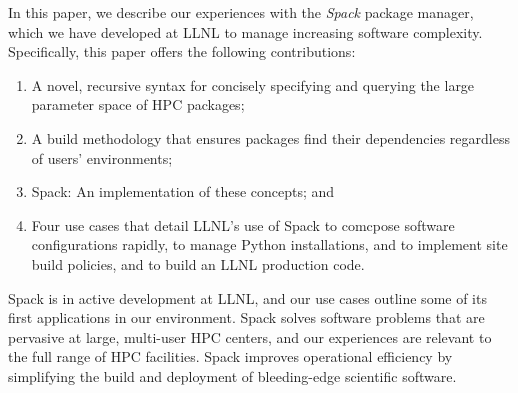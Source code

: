 In this paper, we describe our experiences with the {\it Spack} package manager,
which we have developed at LLNL to manage increasing software complexity.
Specifically, this paper offers the following contributions:
\begin{enumerate}
\item A novel, recursive syntax for concisely specifying and querying
      the large parameter space of HPC packages;
\item A build methodology that ensures packages find their dependencies
      regardless of users' environments;
\item Spack: An implementation of these concepts; and
\item Four use cases that detail LLNL's use of Spack to comcpose
      software configurations rapidly, to manage Python installations, and
      to implement site build policies, and to build an LLNL production code.
\end{enumerate}

\noindent Spack is in active development at LLNL, and our use cases outline some of
its first applications in our environment.  Spack solves software problems
that are pervasive at large, multi-user HPC centers, and our experiences
are relevant to the full range of HPC facilities.  Spack improves
operational efficiency by simplifying the build and deployment of
bleeding-edge scientific software.

